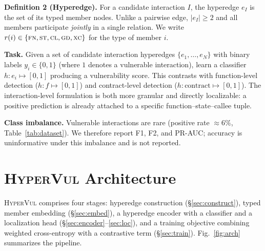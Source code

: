\documentclass[conference]{IEEEtran}
\newcommand{\hypervul}{\textsc{HyperVul}}
\begin{document}
\noindent\textbf{Definition 2 (Hyperedge).} For a candidate interaction $I$, the
hyperedge $e_I$ is the set of its typed member nodes. Unlike a pairwise edge,
$|e_I| \ge 2$ and all members participate \emph{jointly} in a single relation. We
write $r(i)\in\{\textsc{fn},\textsc{st},\textsc{cl},\textsc{gd},\textsc{xc}\}$ for the
type of member $i$.

\noindent\textbf{Task.} Given a set of candidate interaction hyperedges
$\{e_1,\dots,e_N\}$ with binary labels $y_i \in \{0,1\}$ (where $1$ denotes a
vulnerable interaction), learn a classifier $h : e_i \mapsto [0,1]$ producing a
vulnerability score. This contrasts with function-level detection ($h: f \mapsto
[0,1]$) and contract-level detection ($h: \text{contract} \mapsto [0,1]$). The
interaction-level formulation is both more granular and directly localizable: a
positive prediction is already attached to a specific function--state--callee tuple.

\noindent\textbf{Class imbalance.} Vulnerable interactions are rare (positive rate
$\approx 6\%$, Table~\ref{tab:dataset}). We therefore report F1, F2, and PR-AUC;
accuracy is uninformative under this imbalance and is not reported.

\section{\hypervul{} Architecture}
\label{sec:arch}

\hypervul{} comprises four stages: hyperedge construction (\S\ref{sec:construct}),
typed member embedding (\S\ref{sec:embed}), a hyperedge encoder with a classifier and
a localization head (\S\ref{sec:encoder}--\ref{sec:loc}), and a training objective
combining weighted cross-entropy with a contrastive term (\S\ref{sec:train}).
Fig.~\ref{fig:arch} summarizes the pipeline.
\end{document}
